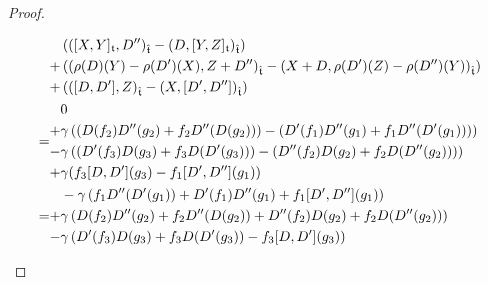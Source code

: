 \begin{proof}
\begin{enumerate}
$$\begin{aligned}
                                &
                                \begin{aligned}
                                    & \left( ( [X, Y]_{\toroidal}, D'')_{\extendedtoroidal} - (D, [Y, Z]_{\toroidal})_{\extendedtoroidal} \right)
                                    \\
                                    + & \left( \left(\rho(D)(Y) - \rho(D')(X), Z + D'' \right)_{\extendedtoroidal} - \left( X + D, \rho(D')(Z) - \rho(D'')(Y) \right)_{\extendedtoroidal} \right)
                                    \\
                                    + & \left( \left( [D, D'], Z \right)_{\extendedtoroidal} - \left(X, [D', D'']\right)_{\extendedtoroidal} \right)
                                \end{aligned}
                                \\
                                = &
                                \begin{aligned}
                                    & 0
                                    \\
                                    + & \gamma\left( \left( D(f_2) D''(g_2) + f_2 D''( D(g_2) ) \right) - \left( D'(f_1) D''(g_1) + f_1 D''( D'(g_1) ) \right) \right)
                                    \\
                                    - & \gamma\left( \left( D'(f_3) D(g_3) + f_3 D( D'(g_3) ) \right) - \left( D''(f_2) D(g_2) + f_2 D( D''(g_2) ) \right) \right)
                                    \\
                                    + & \gamma( f_3 [D, D'](g_3) - f_1 [D', D''](g_1) )
                                \end{aligned}
                                \\
                                = &
                                \begin{aligned}
                                    & -\gamma\left( f_1 D''( D'(g_1) ) + D'(f_1) D''(g_1) + f_1[D', D''](g_1) \right)
                                    \\
                                    + & \gamma\left( D(f_2) D''(g_2) + f_2 D''( D(g_2) ) + D''(f_2) D(g_2) + f_2 D( D''(g_2) ) \right)
                                    \\
                                    - & \gamma\left( D'(f_3) D(g_3) + f_3 D( D'(g_3) ) - f_3 [D, D'](g_3) \right)
                                \end{aligned}

\end{aligned}$$
\end{enumerate}
\end{proof}
